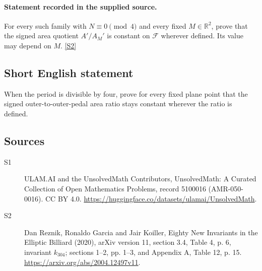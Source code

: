 \documentclass[11pt]{article}
\newcommand{\sref}[2]{\hyperlink{source:#1:#2}{[S#2]}}
\begin{document}
\paragraph{Statement recorded in the supplied source.}
For every such family with $N\equiv0\pmod4$ and every fixed $M\in\mathbb R^2$, prove that the signed area quotient $A'/A_M'$ is constant on $\mathcal F$ wherever defined. Its value may depend on $M$. \sref{5100016}{2}
\subsection{Short English statement}
When the period is divisible by four, prove for every fixed plane point that the signed outer-to-outer-pedal area ratio stays constant wherever the ratio is defined.
\subsection{Sources}
\begin{description}
\item[\hypertarget{source:5100016:1}{S1}] ULAM.AI and the UnsolvedMath Contributors, UnsolvedMath: A Curated Collection of Open Mathematics Problems, record 5100016 (AMR-050-0016). CC BY 4.0. \url{https://huggingface.co/datasets/ulamai/UnsolvedMath}.
\item[\hypertarget{source:5100016:2}{S2}] Dan Reznik, Ronaldo Garcia and Jair Koiller, Eighty New Invariants in the Elliptic Billiard (2020), arXiv version 11, section 3.4, Table 4, p. 6, invariant $k_{304}$; sections 1--2, pp. 1--3, and Appendix A, Table 12, p. 15. \url{https://arxiv.org/abs/2004.12497v11}.
\end{description}
\label{end:5100016}
\end{document}
